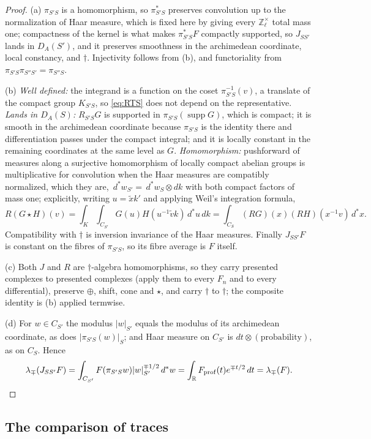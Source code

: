 \documentclass[11pt]{amsart}
\theoremstyle{definition}
\theoremstyle{remark}
\newcommand{\R}{\mathbb R}
\newcommand{\Z}{\mathbb Z}
\newcommand{\dstar}{\,d^{*}}
\newcommand{\supp}{\operatorname{supp}}
\newcommand{\DA}{D_A}
\begin{document}
\begin{proof}
(a)  $\pi_{S'S}$ is a homomorphism, so $\pi_{S'S}^{*}$ preserves convolution up
to the normalization of Haar measure, which is fixed here by giving every
$\Z_{\ell}^{\times}$ total mass one; compactness of the kernel is what makes
$\pi_{S'S}^{*}F$ compactly supported, so $J_{SS'}$ lands in $\DA(S')$, and it
preserves smoothness in the archimedean coordinate, local constancy, and
$\dagger$.  Injectivity follows from (b), and functoriality from
$\pi_{S'S}\pi_{S''S'}=\pi_{S''S}$.

(b)  \emph{Well defined:} the integrand is a function on the coset
$\pi_{S'S}^{-1}(v)$, a translate of the compact group $K_{S'S}$, so
\eqref{eq:RTS} does not depend on the representative.  \emph{Lands in
$\DA(S)$:} $R_{S'S}G$ is supported in $\pi_{S'S}(\supp G)$, which is compact; it
is smooth in the archimedean coordinate because $\pi_{S'S}$ is the identity
there and differentiation passes under the compact integral; and it is locally
constant in the remaining coordinates at the same level as $G$.
\emph{Homomorphism:} pushforward of measures along a surjective homomorphism of
locally compact abelian groups is multiplicative for convolution when the Haar
measures are compatibly normalized, which they are, $\dstar w_{S'}=\dstar
w_S\otimes dk$ with both compact factors of mass one; explicitly, writing
$u=\tilde xk'$ and applying Weil's integration formula,
\[
R(G\star H)(v)=\int_{K}\int_{C_{S'}}G(u)H(u^{-1}\tilde vk)\dstar u\,dk
=\int_{C_S}(RG)(x)(RH)(x^{-1}v)\dstar x .
\]
Compatibility with $\dagger$ is inversion invariance of the Haar measures.
Finally $J_{SS'}F$ is constant on the fibres of $\pi_{S'S}$, so its fibre average
is $F$ itself.

(c)  Both $J$ and $R$ are $\dagger$-algebra homomorphisms, so they carry
presented complexes to presented complexes (apply them to every $F_n$ and to
every differential), preserve $\oplus$, shift, cone and $\star$, and carry
$\dagger$ to $\dagger$; the composite identity is (b) applied termwise.

(d)  For $w\in C_{S'}$ the modulus $|w|_{S'}$ equals the modulus of its archimedean
coordinate, as does $|\pi_{S'S}(w)|_S$; and Haar measure on $C_{S'}$ is
$dt\otimes(\text{probability})$, as on $C_S$.  Hence
\[
\lambda_{\mp}(J_{SS'}F)=\int_{C_{S'}}F(\pi_{S'S}w)|w|_{S'}^{\mp1/2}\dstar w
=\int_{\R}F_{\mathrm{prof}}(t)e^{\mp t/2}\,dt=\lambda_{\mp}(F).\qedhere
\]
\end{proof}

\subsection{The comparison of traces}
\end{document}
